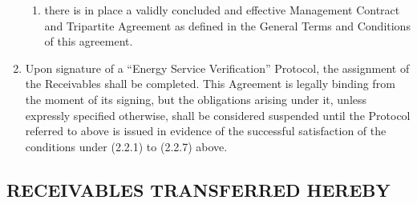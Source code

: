 \documentclass[a4paper]{article}
\begin{document}
\begin{enumerate}
\begin{enumerate}
  \item{there is in place a validly concluded and effective Management
      Contract and Tripartite Agreement as defined in the General
      Terms and Conditions of this agreement.}
  \end{enumerate}

\item{Upon signature of a “Energy Service Verification” Protocol, the assignment of
    the Receivables shall be completed. This Agreement is legally
    binding from the moment of its signing, but the obligations
    arising under it, unless expressly specified otherwise, shall be
    considered suspended until the Protocol referred to above is
    issued in evidence of the successful satisfaction of the
    conditions under (2.2.1) to (2.2.7) above.}

\end{enumerate}

\subsection{RECEIVABLES TRANSFERRED HEREBY}
\end{document}
